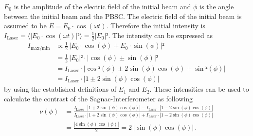  $E_0$ is the amplitude of the electric field of the initial beam and $\phi$ is the angle between the initial beam and the PBSC. 
 The electric field of the initial beam is assumed to be $E = E_0 \cdot \cos(\omega t)$. Therefore the initial intensity is
 $I_{\text{Laser}} = \langle |E_0 \cdot \cos(\omega t)|² \rangle = \frac{1}{2} |E_0|²$.
 The intensity can be expressed as 
 \begin{align*}
    I_{\text{max/min}} &\propto \frac{1}{2} \, |E_0 \cdot \cos(\phi) \pm E_0 \cdot \sin(\phi)|² \\
    &= \frac{1}{2} \,|E_0|² \cdot |\cos(\phi) \pm \sin(\phi)|² \\
    &= I_{\text{Laser}}  \cdot |\cos²(\phi) \pm 2\sin(\phi)\cos(\phi) + \sin²(\phi)| \\
    &= I_{\text{Laser}}  \cdot |1 \pm 2\sin(\phi)\cos(\phi)|
 \end{align*}
 by using the established definitions of $E_1$ and $E_2$. 
 These intensities can be used to calculate the contrast of the Sagnac-Interferometer as following 
 \begin{align}
    \nu(\phi) &= \frac{I_{\text{Laser}}  \cdot |1 + 2\sin(\phi)\cos(\phi)|- I_{\text{Laser}}  \cdot |1 - 2\sin(\phi)\cos(\phi)|}{I_{\text{Laser}}  \cdot |1 + 2\sin(\phi)\cos(\phi)|+ I_{\text{Laser}}  \cdot |1 - 2\sin(\phi)\cos(\phi)|} \nonumber \\
    &= \frac{|4 \sin(\phi)\cos(\phi)|}{2} = 2 \, |\sin(\phi)\cos(\phi)| \, . 
    \label{eqn:contrast_Sagnac}
 \end{align}

